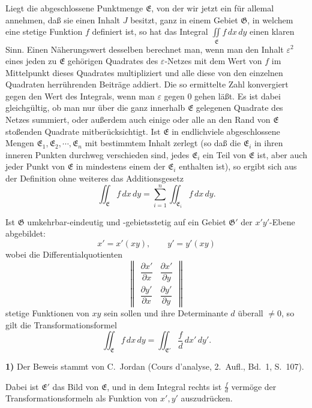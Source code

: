 \documentclass{article}
\begin{document}
Liegt die abgeschlossene Punktmenge $\mathfrak{E}$, von der wir jetzt ein für allemal annehmen, daß sie einen Inhalt $J$ besitzt, ganz in einem Gebiet $\mathfrak{G}$, in welchem eine stetige Funktion $f$ definiert ist, so hat das Integral $\displaystyle\iint\limits_{\mathfrak{E}} f\,dx\,dy$ einen klaren Sinn. Einen Näherungswert desselben berechnet man, wenn man den Inhalt $\varepsilon^2$ eines jeden zu $\mathfrak{E}$ gehörigen Quadrates des $\varepsilon$-Netzes mit dem Wert von $f$ im Mittelpunkt dieses Quadrates multipliziert und alle diese von den einzelnen Quadraten herrührenden Beiträge addiert. Die so ermittelte Zahl konvergiert gegen den Wert des Integrals, wenn man $\varepsilon$ gegen $0$ gehen läßt. Es ist dabei gleichgültig, ob man nur über die ganz innerhalb $\mathfrak{E}$ gelegenen Quadrate des Netzes summiert, oder außerdem auch einige oder alle an den Rand von $\mathfrak{E}$ stoßenden Quadrate mitberücksichtigt. Ist $\mathfrak{E}$ in endlichviele abgeschlossene Mengen $\mathfrak{E}_1, \mathfrak{E}_2, \cdots, \mathfrak{E}_n$ mit bestimmtem Inhalt zerlegt (so daß die $\mathfrak{E}_i$ in ihren inneren Punkten durchweg verschieden sind, jedes $\mathfrak{E}_i$ ein Teil von $\mathfrak{E}$ ist, aber auch jeder Punkt von $\mathfrak{E}$ in mindestens einem der $\mathfrak{E}_i$ enthalten ist), so ergibt sich aus der Definition ohne weiteres das Additionsgesetz
\[ \iint_{\mathfrak{E}} f\,dx\,dy = \sum_{i=1}^n \iint_{\mathfrak{E}_i} f\,dx\,dy. \]

Ist $\mathfrak{G}$ umkehrbar-eindeutig und -gebietsstetig auf ein Gebiet $\mathfrak{G}'$ der $x'y'$-Ebene abgebildet:
\[ x' = x'(xy), \qquad y' = y'(xy) \tag{14} \]
wobei die Differentialquotienten
\[ \begin{Vmatrix} \dfrac{\partial x'}{\partial x} & \dfrac{\partial x'}{\partial y} \\[1ex] \dfrac{\partial y'}{\partial x} & \dfrac{\partial y'}{\partial y} \end{Vmatrix} \]
stetige Funktionen von $xy$ sein sollen und ihre Determinante $d$ überall $\neq 0$, so gilt die Transformationsformel
\[ \iint_{\mathfrak{E}} f\,dx\,dy = \iint_{\mathfrak{E}'} \frac{f}{d}\,dx'\,dy'. \]

\textbf{1)} Der Beweis stammt von C.~Jordan (Cours d'analyse, 2.~Aufl., Bd.~1, S.~107).

Dabei ist $\mathfrak{E}'$ das Bild von $\mathfrak{E}$, und in dem Integral rechts ist $\frac{f}{d}$ vermöge der Transformationsformeln als Funktion von $x', y'$ auszudrücken.
\end{document}
